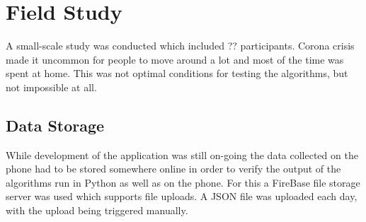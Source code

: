 \section{Field Study}
A small-scale study was conducted which included ?? participants. Corona crisis made it uncommon for people to move around a lot and most of the time was spent at home. This was not optimal conditions for testing the algorithms, but not impossible at all.

\subsection{Data Storage}
While development of the application was still on-going the data collected on the phone had to be stored somewhere online in order to verify the output of the algorithms run in Python as well as on the phone. For this a FireBase file storage server was used which supports file uploads. A JSON file was uploaded each day, with the upload being triggered manually. 


